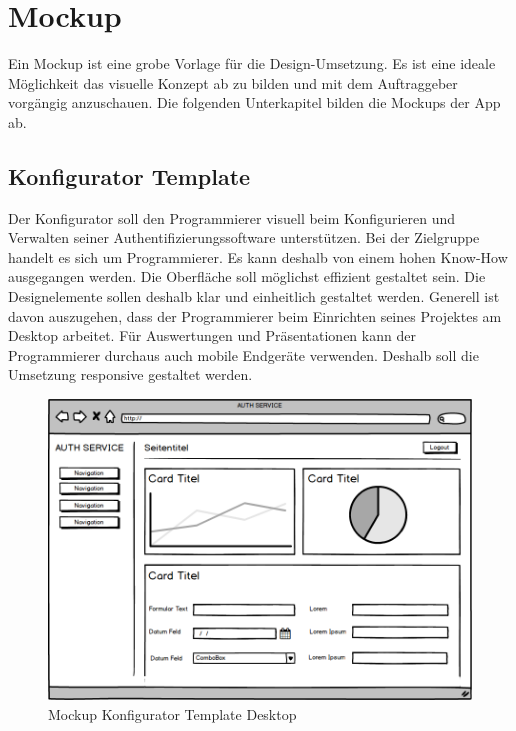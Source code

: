 \newpage

\section{Mockup}\label{mockup}

Ein Mockup ist eine grobe Vorlage für die Design-Umsetzung. Es ist eine
ideale Möglichkeit das visuelle Konzept ab zu bilden und mit dem
Auftraggeber vorgängig anzuschauen. Die folgenden Unterkapitel bilden
die Mockups der App ab.

\subsection{Konfigurator Template}\label{konfigurator-template}

Der Konfigurator soll den Programmierer visuell beim Konfigurieren und
Verwalten seiner Authentifizierungssoftware unterstützen. Bei der
Zielgruppe handelt es sich um Programmierer. Es kann deshalb von einem
hohen Know-How ausgegangen werden. Die Oberfläche soll möglichst
effizient gestaltet sein. Die Designelemente sollen deshalb klar und
einheitlich gestaltet werden. Generell ist davon auszugehen, dass der
Programmierer beim Einrichten seines Projektes am Desktop arbeitet. Für
Auswertungen und Präsentationen kann der Programmierer durchaus auch
mobile Endgeräte verwenden. Deshalb soll die Umsetzung responsive
gestaltet werden.

\begin{figure}[htbp]
\centering
\includegraphics{images/mockups/General.png}
\caption{Mockup Konfigurator Template Desktop}
\end{figure}

